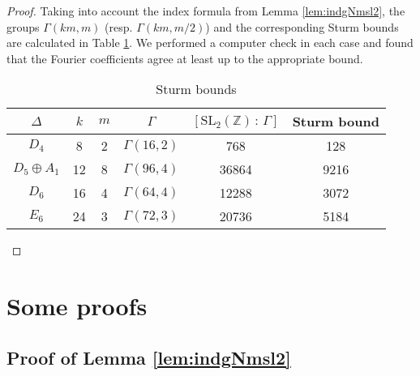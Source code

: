\documentclass{article}
\theoremstyle{definition}
\newcommand{\ZZ} {{\mathbb Z}}		%
\begin{document}
\begin{proof}	
Taking into account the index formula from Lemma \ref{lem:indgNmsl2}, the groups 
$\Gamma(km,m)$ (resp. $\Gamma(km,m/2)$) and the corresponding Sturm bounds are calculated in 
Table \ref{table:sturm}. We performed a computer check in each case and found that the 
Fourier coefficients agree at least up to the appropriate bound.
	
	\begin{table}
	\begin{center}
		\begin{tabular}{ |c|c|c|c|c|c| }
			\hline
			$\Delta$ & $k$ & $m$ & $\Gamma$ & $[\mathrm{SL}_2(\ZZ) \, : \, \Gamma]$ & Sturm bound \\
			\hline
			$D_4$ & 8 & 2 & $\Gamma(16,2)$ & 768 & 128 \\
			$D_5\oplus A_1$ & 12 & 8 & $\Gamma(96,4)$ & 36864 & 9216 \\
			$D_6$ & 16 & 4 & $\Gamma(64,4)$ & 12288 & 3072 \\
			$E_6$ & 24 & 3 & $\Gamma(72,3)$ & 20736 & 5184 \\
			\hline
		\end{tabular}
		\vspace{0.2in}
		\caption{Sturm bounds}
				\label{table:sturm}
\end{center}
	\end{table}
\end{proof}






\appendix
\section{Some proofs}
\subsection{Proof of Lemma \ref{lem:indgNmsl2}}
\label{sec:app0}
\end{document}
